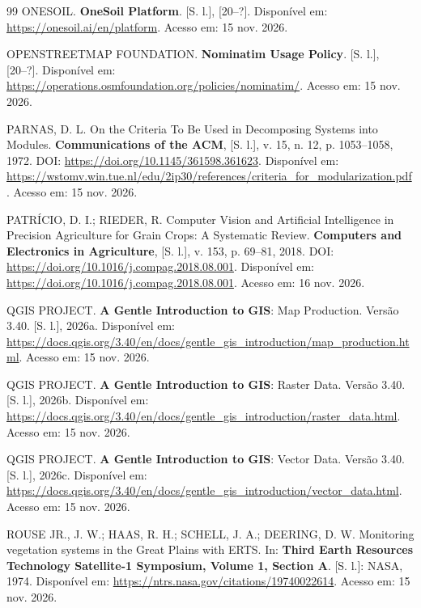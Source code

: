 \begin{thebibliography}{99}
\MakeUppercase{{OneSoil}}.
\textbf{{OneSoil Platform}}.
[S. l.], [20--?].
Disponível em: \url{https://onesoil.ai/en/platform}.
Acesso em: 15 nov. 2026.

\MakeUppercase{{OpenStreetMap Foundation}}.
\textbf{Nominatim Usage Policy}.
[S. l.], [20--?].
Disponível em: \url{https://operations.osmfoundation.org/policies/nominatim/}.
Acesso em: 15 nov. 2026.

\MakeUppercase{Parnas}, D. L.
On the Criteria To Be Used in Decomposing Systems into Modules.
\textbf{Communications of the ACM}, [S. l.],
v. 15,
n. 12,
p. 1053--1058,
1972.
DOI: \url{https://doi.org/10.1145/361598.361623}.
Disponível em: \url{https://wstomv.win.tue.nl/edu/2ip30/references/criteria_for_modularization.pdf}.
Acesso em: 15 nov. 2026.

\MakeUppercase{Patrício}, D. I.; \MakeUppercase{Rieder}, R.
Computer Vision and Artificial Intelligence in Precision Agriculture for Grain Crops: A Systematic Review.
\textbf{Computers and Electronics in Agriculture}, [S. l.],
v. 153,
p. 69--81,
2018.
DOI: \url{https://doi.org/10.1016/j.compag.2018.08.001}.
Disponível em: \url{https://doi.org/10.1016/j.compag.2018.08.001}.
Acesso em: 16 nov. 2026.

\MakeUppercase{{QGIS Project}}.
\textbf{A Gentle Introduction to GIS}: Map Production.
Versão 3.40.
[S. l.], 2026a.
Disponível em: \url{https://docs.qgis.org/3.40/en/docs/gentle_gis_introduction/map_production.html}.
Acesso em: 15 nov. 2026.

\MakeUppercase{{QGIS Project}}.
\textbf{A Gentle Introduction to GIS}: Raster Data.
Versão 3.40.
[S. l.], 2026b.
Disponível em: \url{https://docs.qgis.org/3.40/en/docs/gentle_gis_introduction/raster_data.html}.
Acesso em: 15 nov. 2026.

\MakeUppercase{{QGIS Project}}.
\textbf{A Gentle Introduction to GIS}: Vector Data.
Versão 3.40.
[S. l.], 2026c.
Disponível em: \url{https://docs.qgis.org/3.40/en/docs/gentle_gis_introduction/vector_data.html}.
Acesso em: 15 nov. 2026.

\MakeUppercase{Rouse Jr.}, J. W.; \MakeUppercase{Haas}, R. H.; \MakeUppercase{Schell}, J. A.; \MakeUppercase{Deering}, D. W.
Monitoring vegetation systems in the Great Plains with {ERTS}.
In:
\textbf{Third Earth Resources Technology Satellite-1 Symposium, Volume 1, Section A}.
[S. l.]: NASA, 1974.
Disponível em: \url{https://ntrs.nasa.gov/citations/19740022614}.
Acesso em: 15 nov. 2026.


\end{thebibliography}
